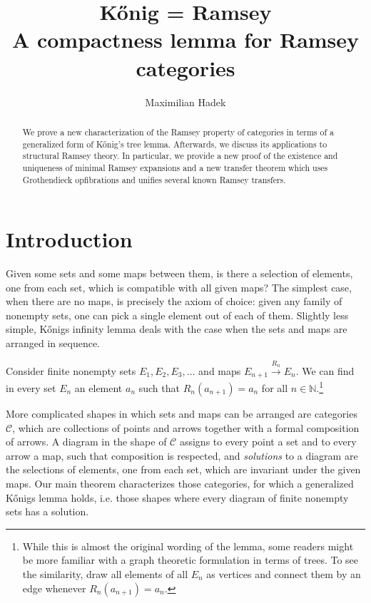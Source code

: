 \documentclass[preprint,12pt]{elsarticle}
\newcommand{\cat}[1]{\mathcal{#1}}
\begin{document}
\begin{frontmatter}

\title{K\H{o}nig = Ramsey \\ \Large A compactness lemma for Ramsey categories} 
\author[1]{Maximilian Hadek}

\begin{abstract}
    We prove a new characterization of the Ramsey property of categories in terms of a generalized form of K\H{o}nig's tree lemma. Afterwards, we discuss its applications to structural Ramsey theory. In particular, we provide a new proof of the existence and uniqueness of minimal Ramsey expansions and a new transfer theorem which uses Grothendieck opfibrations and unifies several known Ramsey transfers.
\end{abstract}


\end{frontmatter}


\section{Introduction}




Given some sets and some maps between them, is there a selection of elements, one from each set, which is compatible with all given maps?
The simplest case, when there are no maps, is precisely the axiom of choice: given any family of nonempty sets, one can pick a single element out of each of them. Slightly less simple, K\H{o}nigs infinity lemma deals with the case when the sets and maps are arranged in sequence.


\begin{thm}
    Consider finite nonempty sets $E_1,E_2,E_3,\dots$ and maps $E_{n+1}\xrightarrow{R_n}E_n$. We can find in every set $E_n$ an element $a_n$ such that $R_n(a_{n+1}) = a_n$ for all $n\in\mathbb{N}$.\footnote{While this is almost the original wording of the lemma, some readers might be more familiar with a graph theoretic formulation in terms of trees. To see the similarity, draw all elements of all $E_n$ as vertices and connect them by an edge whenever $R_n(a_{n+1})=a_n$.}
    
\end{thm}
More complicated shapes in which sets and maps can be arranged are categories $\cat C$, which are collections of points and arrows together with a formal composition of arrows. A diagram in the shape of $\cat C$ assigns to every point a set and to every arrow a map, such that composition is respected, and \emph{solutions} to a diagram are the selections of elements, one from each set, which are invariant under the given maps.
Our main theorem characterizes those categories, for which a generalized K\H{o}nigs lemma holds, i.e. those shapes where every diagram of finite nonempty sets has a solution.
\end{document}
